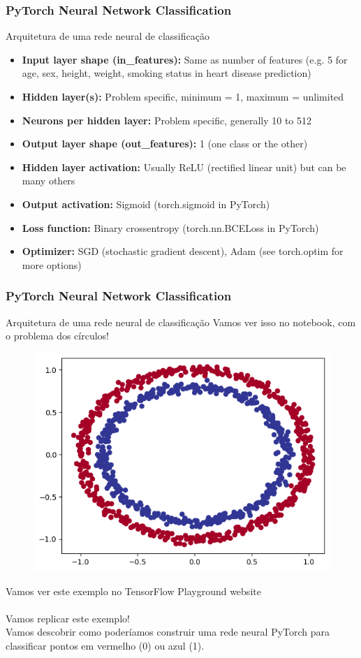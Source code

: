\documentclass{beamer}
\begin{document}
\begin{frame}
	\frametitle{PyTorch Neural Network Classification}
	\begin{block}{Arquitetura de uma rede neural de classificação}
		\begin{itemize}
			\item\textbf{Input layer shape (in\_features):} Same as number of features (e.g. 5 for age, sex, height, weight, smoking status in heart disease prediction)
			\item \textbf{Hidden layer(s):} Problem specific, minimum = 1, maximum = unlimited
			\item \textbf{Neurons per hidden layer:} Problem specific, generally 10 to 512
			\item \textbf{Output layer shape (out\_features):} 1 (one class or the other)
			\item \textbf{Hidden layer activation:} Usually ReLU (rectified linear unit) but can be many others
			\item \textbf{Output activation:} Sigmoid (torch.sigmoid in PyTorch)
			\item \textbf{Loss function:} Binary crossentropy (torch.nn.BCELoss in PyTorch)
			\item \textbf{Optimizer:} SGD (stochastic gradient descent), Adam (see torch.optim for more options)
		\end{itemize}
	\end{block}
\end{frame}
\begin{frame}
	\frametitle{PyTorch Neural Network Classification}
	\begin{block}{Arquitetura de uma rede neural de classificação}
	Vamos ver isso no notebook, com o problema dos círculos!
	\begin{figure}
		\centering
		\includegraphics[width=0.4\linewidth]{figures/make_circle}
	\end{figure}
	Vamos ver este exemplo no TensorFlow Playground website \\
	\href{https://playground.tensorflow.org/}{} \\
	Vamos replicar este exemplo! \\
	Vamos descobrir como poderíamos construir uma rede neural PyTorch para classificar pontos em vermelho (0) ou azul (1).
	\end{block}
\end{frame}
\end{document}
